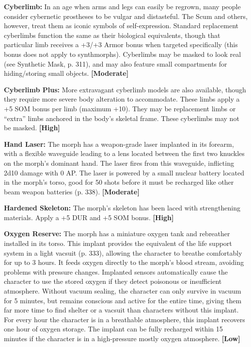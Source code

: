 \textbf{Cyberlimb:} In an age when arms and legs can easily be regrown, many people consider cybernetic prostheses to be vulgar and distasteful. The Scum and others, however, treat them as iconic symbols of self-expression. Standard replacement cyberlimbs function the same as their biological equivalents, though that particular limb receives a +3/+3 Armor bonus when targeted specifically (this bonus does not apply to synthmorphs). Cyberlimbs may be masked to look real (see Synthetic Mask, p. 311), and may also feature small compartments for hiding/storing small objects. \textbf{[Moderate]} 

\textbf{Cyberlimb Plus:} More extravagant cyberlimb models are also available, though they require more severe body alteration to accommodate. These limbs apply a +5 SOM bonus per limb (maximum +10). They may be replacement limbs or ``extra'' limbs anchored in the body’s skeletal frame. These cyberlimbs may not be masked. \textbf{[High]} 

\textbf{Hand Laser:} The morph has a weapon-grade laser implanted in its forearm, with a flexible waveguide leading to a lens located between the first two knuckles on the morph’s dominant hand. The laser fires from this waveguide, inflicting 2d10 damage with 0 AP. The laser is powered by a small nuclear battery located in the morph’s torso, good for 50 shots before it must be recharged like other beam weapon batteries (p. 338). \textbf{[Moderate]} 

\textbf{Hardened Skeleton:} The morph’s skeleton has been laced with strengthening materials. Apply a +5 DUR and +5 SOM bonus. \textbf{[High]} 

\textbf{Oxygen Reserve:} The morph has a miniature oxygen tank and rebreather installed in its torso. This implant provides the equivalent of the life support system in a light vacsuit (p. 333), allowing the character to breathe comfortably for up to 3 hours. It feeds oxygen directly to the morph’s blood stream, avoiding problems with pressure changes. Implanted sensors automatically cause the character to use the stored oxygen if they detect poisonous or insufficient atmosphere. Without vacuum sealing, the character can only survive in vacuum for 5 minutes, but remains conscious and active for the entire time, giving them far more time to find shelter or a vacsuit than characters without this implant. For every hour the character is in a breathable atmosphere, this implant recovers one hour of oxygen storage. The implant can be fully recharged within 15 minutes if the character is in a high-pressure mostly oxygen atmosphere. \textbf{[Low]} 

